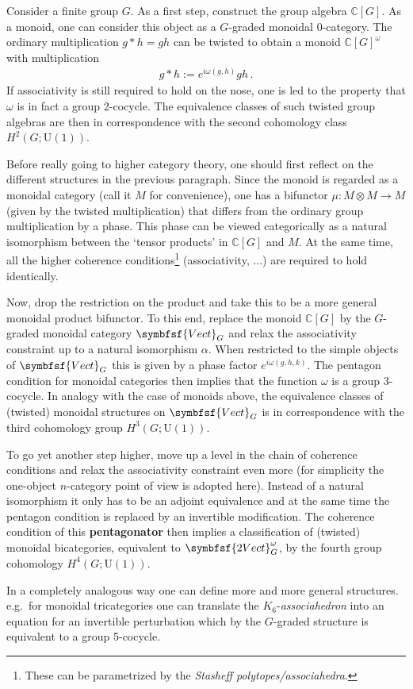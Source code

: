     Consider a finite group $G$. As a first step, construct the group algebra $\mathbb{C}[G]$. As a monoid, one can consider this object as a $G$-graded monoidal 0-category. The ordinary multiplication $g\ast h=gh$ can be twisted to obtain a monoid $\mathbb{C}[G]^\omega$ with multiplication
    \begin{gather}
        g\ast h := e^{i\omega(g,h)}gh\,.
    \end{gather}
    If associativity is still required to hold on the nose, one is led to the property that $\omega$ is in fact a group 2-cocycle. The equivalence classes of such twisted group algebras are then in correspondence with the second cohomology class $H^2(G;\mathrm{U}(1))$.

    Before really going to higher category theory, one should first reflect on the different structures in the previous paragraph. Since the monoid is regarded as a monoidal category (call it $M$ for convenience), one has a bifunctor $\mu:M\otimes M\rightarrow M$ (given by the twisted multiplication) that differs from the ordinary group multiplication by a phase. This phase can be viewed categorically as a natural isomorphism between the `tensor products' in $\mathbb{C}[G]$ and $M$. At the same time, all the higher coherence conditions\footnote{These can be parametrized by the \textit{Stasheff polytopes/associahedra}.} (associativity, ...) are required to hold identically.

    Now, drop the restriction on the product and take this to be a more general monoidal product bifunctor. To this end, replace the monoid $\mathbb{C}[G]$ by the $G$-graded monoidal category $\symbfsf{Vect}_G$ and relax the associativity constraint up to a natural isomorphism $\alpha$. When restricted to the simple objects of $\symbfsf{Vect}_G$ this is given by a phase factor $e^{i\omega(g,h,k)}$. The pentagon condition for monoidal categories then implies that the function $\omega$ is a group 3-cocycle. In analogy with the case of monoids above, the equivalence classes of (twisted) monoidal structures on $\symbfsf{Vect}_G$ is in correspondence with the third cohomology group $H^3(G;\mathrm{U}(1))$.

    To go yet another step higher, move up a level in the chain of coherence conditions and relax the associativity constraint even more (for simplicity the one-object $n$-category point of view is adopted here). Instead of a natural isomorphism it only has to be an adjoint equivalence and at the same time the pentagon condition is replaced by an invertible modification. The coherence condition of this \textbf{pentagonator} then implies a classification of (twisted) monoidal bicategories, equivalent to $\symbfsf{2Vect}_G^\omega$, by the fourth group cohomology $H^4(G;\mathrm{U}(1))$.

    In a completely analogous way one can define more and more general structures. e.g.~for monoidal tricategories one can translate the $K_6$-\textit{associahedron} into an equation for an invertible perturbation which by the $G$-graded structure is equivalent to a group 5-cocycle.

